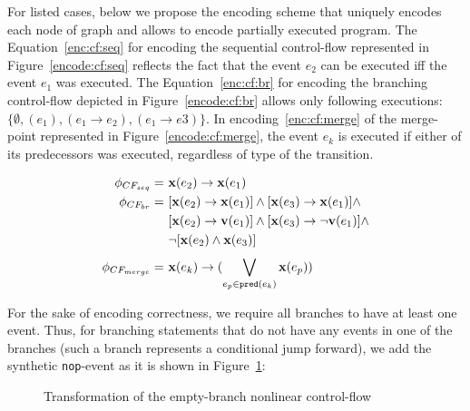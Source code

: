For listed cases, below we propose the encoding scheme that uniquely encodes each node of graph and allows to encode partially executed program.
The Equation~\ref{enc:cf:seq} for encoding the sequential control-flow represented in Figure~\ref{encode:cf:seq} reflects the fact that the event $e_2$ can be executed iff the event $e_1$ was executed. The Equation~\ref{enc:cf:br} for encoding the branching control-flow depicted in Figure~\ref{encode:cf:br} allows only following executions: $\{\emptyset, (e_1), (e_1 \rightarrow e_2), (e_1 \rightarrow e3) \}$. In encoding~\ref{enc:cf:merge} of the merge-point represented in Figure~\ref{encode:cf:merge}, the event $e_k$ is executed if either of its predecessors was executed, regardless of type of the transition.

\begin{align}
\phi_{CF_{seq}}   = \ & \mathbf{x}(e_2) \rightarrow \mathbf{x}(e_1) \label{enc:cf:seq} \\
\phi_{CF_{br}}    = \ & [\mathbf{x}(e_2) \rightarrow \mathbf{x}(e_1)] \land [\mathbf{x}(e_3) \rightarrow \mathbf{x}(e_1)] \land \nonumber \\
				  &  [\mathbf{x}(e_2) \rightarrow \mathbf{v}(e_1)] \land [\mathbf{x}(e_3) \rightarrow \lnot\mathbf{v}(e_1)] \land \nonumber \\
				  & \lnot [\mathbf{x}(e_2) \land \mathbf{x}(e_3)]  \label{enc:cf:br} \\
\phi_{CF_{merge}} = \ & \mathbf{x}(e_k) \rightarrow (\bigvee\limits_{e_p \in \mathtt{pred}(e_k)}^{} \mathbf{x}(e_p)) \label{enc:cf:merge}
\end{align}


For the sake of encoding correctness, we require all branches to have at least one event. Thus, for branching statements that do not have any events in one of the branches (such a branch represents a conditional jump forward), we add the synthetic \texttt{nop}-event as it is shown in Figure~\ref{encode:branching:nop}:

\begin{figure}[H]
    \centering
    \caption{Transformation of the empty-branch nonlinear control-flow}
    \label{encode:branching:nop}
\end{figure}


